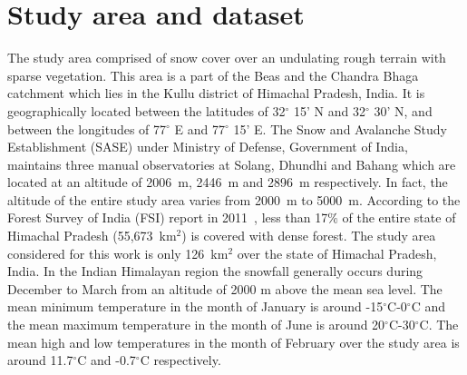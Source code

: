 \section{Study area and dataset}
\label{S:3}
The study area comprised of snow cover over an undulating rough terrain with sparse vegetation. This area is a part of the Beas and the Chandra Bhaga catchment which lies in the Kullu district of Himachal Pradesh, India. It is geographically located between the latitudes of 32$^\circ$ 15' N and 32$^\circ$ 30' N, and between the longitudes of 77$^\circ$ E and 77$^\circ$ 15' E. The Snow and Avalanche Study Establishment (SASE) under Ministry of Defense, Government of India, maintains three manual observatories at Solang, Dhundhi and Bahang which are located at an altitude of 2006~m, 2446~m and 2896~m respectively. In fact, the altitude of the entire study area varies from 2000~m to 5000~m. According to the Forest Survey of India (FSI) report in 2011~\citep{FSI2011}, less than 17$\%$ of the entire state of Himachal Pradesh (55,673~km$^2$) is covered with dense forest. The study area considered for this work is only 126~km$^2$ over the state of Himachal Pradesh, India. In the Indian Himalayan region the snowfall generally occurs during December to March from an altitude of 2000 m above the mean sea level. The mean minimum temperature in the month of January is around -15$^\circ$C-0$^\circ$C and the mean maximum temperature in the month of June is around 20$^\circ$C-30$^\circ$C. The mean high and low temperatures in the month of February over the study area is around 11.7$^\circ$C  and -0.7$^\circ$C respectively.


